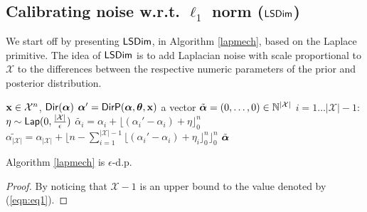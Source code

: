 \documentclass{article}
\begin{document}
\subsection{Calibrating noise w.r.t. $\ell_1$ norm ($\lapmech$)}
\label{sec_ell1_dim}
We start off by presenting $\lapmech$, in Algorithm \ref{lapmech}, based on the Laplace primitive.
The idea of $\lapmech$ is to add Laplacian noise with scale proportional to $\mathcal{X}$ to
the differences between the respective numeric parameters of the prior
and posterior distribution. 
\begin{algorithm}
  \caption{$\lapmech$}
  \label{lapmech}
  \begin{algorithmic}
  \INPUT $\textbf{x}\in\mathcal{X}^n$, $\mathsf{Dir}(\boldsymbol{\alpha})$
  \STATE {} $\boldsymbol{\alpha}' = \mathsf{DirP}(\boldsymbol{\alpha},\boldsymbol{\theta},\textbf{x})$
  \STATE {} a vector $\tilde{\boldsymbol{\alpha}} = (0, \dots, 0 )\in \mathbb{N}^{|\mathcal{X}|}$ 
  \STATE {} $i = 1 \dots |\mathcal{X}| - 1$:
  \STATE \quad {} $\eta \sim \mathsf{Lap}(0, \frac{|\mathcal{X}|}{\epsilon})$
  \STATE \quad \quad  $\tilde{\alpha_i}=\alpha_i + \lfloor{(\alpha_i' - \alpha_i) + \eta}\rfloor^n_0$ 
  \STATE \quad $\tilde{\alpha_{|\mathcal{X}|}} = \alpha_{|\mathcal{X}|} + \lfloor n - \sum_{i = 1}^{|\mathcal{X}|-1}\lfloor{(\alpha_i' - \alpha_i) + \eta_i}\rfloor^n_0 \rfloor^n_0$
   $\tilde{\boldsymbol{\alpha}}$
  \end{algorithmic}
\end{algorithm}
\begin{lem}
  Algorithm \ref{lapmech} is $\epsilon$-d.p.
  \begin{proof} By noticing that $\mathcal{X}-1$ is an upper bound to the value denoted by (\ref{eqn:eq1}). \end{proof}
\end{lem}
\end{document}
